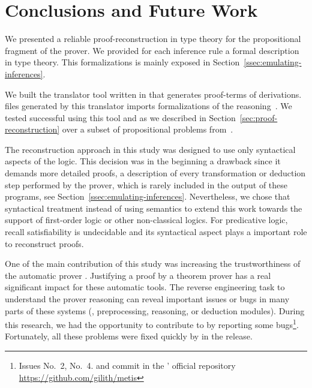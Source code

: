 \documentclass[../main.tex]{subfiles}
\begin{document}

\section{Conclusions and Future Work}
\label{sec:conclusions}

We presented a reliable proof-reconstruction in type theory
for the propositional fragment of the \Metis prover. We provided for
each \Metis inference rule a formal description in type theory.
This formalizations is mainly exposed in
Section~\ref{ssec:emulating-inferences}.

We built the \Athena translator tool written in \Haskell
that generates \Agda proof-terms of \Metis derivations.
\Agda files generated by this translator imports
\Agda formalizations of the \Metis reasoning~\cite{AgdaProp,AgdaMetis}.
We tested successful using this tool and \Agda as we
described in Section~\ref{sec:proof-reconstruction} over a subset of
propositional problems from~\cite{Prieto-Cubides2017}.

The reconstruction approach in this study was designed to use
only syntactical aspects of the logic.
This decision was in the beginning a drawback
since it demands more detailed proofs, a
description of every transformation or deduction step performed by
the prover, which is rarely included in the output of these programs,
see Section~\ref{ssec:emulating-inferences}.
Nevertheless, we chose that syntactical treatment instead of using
semantics to extend this work towards the support of first-order logic
or other non-classical logics.
For predicative logic, recall satisfiability is undecidable and
its syntactical aspect plays a important role to reconstruct proofs.

One of the main contribution of this study was
increasing the trustworthiness of the automatic prover \Metis.
Justifying a proof by a theorem prover
has a real significant impact for these automatic tools.
The reverse engineering task to understand the prover reasoning
can reveal important issues or bugs
in many parts of these systems (\eg, preprocessing, reasoning, or
deduction modules). During this research, we had the opportunity
to contribute to \Metis by reporting some bugs\footnote{Issues No.~2,
No.~4. and commit  in the \Metis' official repository
\url{https://github.com/gilith/metis}}.
Fortunately, all these problems were fixed quickly by
\citeauthor{hurd2003first} in the  release.
\end{document}
